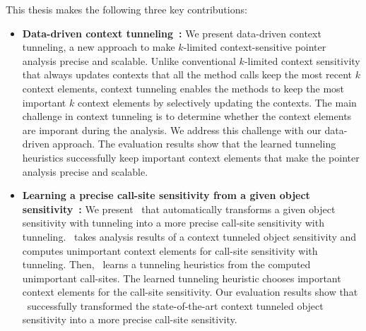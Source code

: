 


This thesis makes the following three key contributions:



\begin{itemize}
\item {\bf Data-driven context tunneling~\cite{JeJeOh18}:}
We present data-driven context tunneling, a new approach to make $k$-limited context-sensitive pointer analysis precise and scalable.
Unlike conventional $k$-limited context sensitivity that always updates contexts that all the method calls keep the most recent $k$ context elements, context tunneling enables the methods to keep the most important $k$ context elements by selectively updating the contexts.
The main challenge in context tunneling is to determine whether the context elements are imporant during the analysis. We address this challenge with our data-driven approach. The evaluation results show that the learned tunneling heuristics successfully keep important context elements that make the pointer analysis precise and scalable.


\item {\bf Learning a precise call-site sensitivity from a given object sensitivity~\cite{JeOh22}:}
We present \ourtechnique~that automatically transforms a given object sensitivity with tunneling into a more precise call-site sensitivity with tunneling. 
\ourtechnique~takes analysis results of a context tunneled object sensitivity and computes unimportant context elements for call-site sensitivity with tunneling. 
Then, \ourtechnique~learns a tunneling heuristics from the computed unimportant call-sites. The learned tunneling heuristic chooses important context elements for the call-site sensitivity. Our evaluation results show that \ourtechnique~successfully transformed the state-of-the-art context tunneled object sensitivity into a more precise call-site sensitivity. 




\end{itemize}
